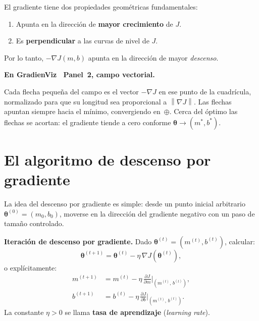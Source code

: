 \documentclass[12pt, a4paper]{article}
\newenvironment{viznota}[1]{%
  \begin{mdframed}[style=vizverde]
  \textbf{\color{bordeteo}En GradienViz \textemdash\ #1.}\quad
}{%
  \end{mdframed}
}
\newenvironment{vizdef}{%
  \begin{mdframed}[style=vizazul]
}{%
  \end{mdframed}
}
\newcommand{\norm}[1]{\left\lVert #1 \right\rVert}
\newcommand{\grad}{\nabla}
\newcommand{\mstar}{m^{*}}
\newcommand{\bstar}{b^{*}}
\begin{document}
El gradiente tiene dos propiedades geométricas fundamentales:
\begin{enumerate}[label=(\roman*)]
  \item Apunta en la dirección de \textbf{mayor crecimiento} de $J$.
  \item Es \textbf{perpendicular} a las curvas de nivel de $J$.
\end{enumerate}

Por lo tanto, $-\grad J(m,b)$ apunta en la dirección de mayor \emph{descenso}.

\begin{viznota}{Panel~2, campo vectorial}
Cada flecha pequeña del campo es el vector $-\grad J$ en ese punto de la cuadrícula,
normalizado para que su longitud sea proporcional a $\norm{\grad J}$.
Las flechas apuntan siempre hacia el mínimo, convergiendo en~$\oplus$.
Cerca del óptimo las flechas se acortan: el gradiente tiende a cero conforme
$\boldsymbol{\theta} \to (\mstar, \bstar)$.
\end{viznota}

\section{El algoritmo de descenso por gradiente}

La idea del descenso por gradiente es simple: desde un punto inicial arbitrario
$\boldsymbol{\theta}^{(0)} = (m_0, b_0)$, moverse en la dirección del gradiente
negativo con un paso de tamaño controlado.

\begin{vizdef}
\textbf{Iteración de descenso por gradiente.} Dado $\boldsymbol{\theta}^{(t)} = (m^{(t)}, b^{(t)})$,
calcular:
\begin{equation}\label{eq:update}
  \boldsymbol{\theta}^{(t+1)} = \boldsymbol{\theta}^{(t)} - \eta\,\grad J\!\left(\boldsymbol{\theta}^{(t)}\right),
\end{equation}
o explícitamente:
\begin{align*}
  m^{(t+1)} &= m^{(t)} - \eta\,\frac{\partial J}{\partial m}\biggr|_{(m^{(t)},\,b^{(t)})}, \\[4pt]
  b^{(t+1)} &= b^{(t)} - \eta\,\frac{\partial J}{\partial b}\biggr|_{(m^{(t)},\,b^{(t)})}.
\end{align*}
La constante $\eta > 0$ se llama \textbf{tasa de aprendizaje} (\emph{learning rate}).
\end{vizdef}
\end{document}
